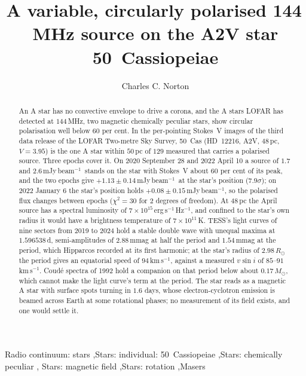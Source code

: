 \documentclass[3p,11pt]{elsarticle}
\newcommand{\kms}{km\,s$^{-1}$}
\newcommand{\mJyb}{mJy\,beam$^{-1}$}
\newcommand{\lnu}{erg\,s$^{-1}$\,Hz$^{-1}$}
\newcommand{\sci}[2]{#1\times10^{#2}}
\newcommand{\Msun}{M_\odot}
\newcommand{\Rsun}{R_\odot}
\begin{document}
\begin{frontmatter}

\title{A variable, circularly polarised 144\,MHz source on the A2V star 50~Cassiopeiae}

\author{Charles C. Norton}

\begin{abstract}
An A star has no convective envelope to drive a corona, and the A stars LOFAR has
detected at $144$\,MHz, two magnetic chemically peculiar stars, show circular
polarisation well below $60$ per cent. In the per-pointing Stokes~V images of the third
data release of the LOFAR Two-metre Sky Survey, 50~Cas (HD~12216, A2V, $48$\,pc,
$V=3.95$) is the one A star within $50$\,pc of $129$ measured that carries a polarised
source. Three epochs cover it. On 2020 September 28 and 2022 April 10 a source of $1.7$
and $2.6$\,\mJyb\ stands on the star with Stokes~V about $60$ per cent of its peak, and
the two epochs give $+1.13\pm0.14$\,\mJyb\ at the star's position ($7.9\sigma$); on
2022 January 6 the star's position holds $+0.08\pm0.15$\,\mJyb, so the polarised flux
changes between epochs ($\chi^2=30$ for $2$ degrees of freedom). At $48$\,pc the April
source has a spectral luminosity of $\sci{7}{15}$\,\lnu, and confined to the star's own
radius it would have a brightness temperature of $\sci{7}{11}$\,K. TESS's light curves of
nine sectors from 2019 to 2024 hold a stable double wave with unequal maxima at
$1.596538$\,d, semi-amplitudes of $2.88$\,mmag at half the period and $1.54$\,mmag at
the period, which Hipparcos recorded at its first harmonic; at the star's radius of
$2.98\,\Rsun$ the period gives an equatorial speed of $94$\,\kms, against a measured
$v\sin i$ of $85$--$91$\,\kms. Coud\'e spectra of 1992 hold a companion on that period
below about $0.17\,\Msun$, which cannot make the light curve's term at the period. The
star reads as a magnetic A star with surface spots turning in $1.6$ days, whose
electron-cyclotron emission is beamed across Earth at some rotational phases; no
measurement of its field exists, and one would settle it.
\end{abstract}

\begin{keyword}
Radio continuum: stars \sep Stars: individual: 50~Cassiopeiae \sep Stars: chemically peculiar \sep
Stars: magnetic field \sep Stars: rotation \sep Masers
\end{keyword}

\end{frontmatter}
\end{document}
